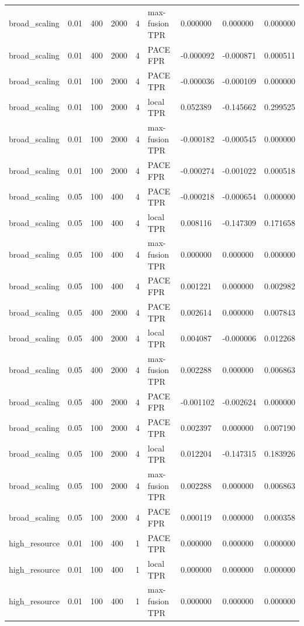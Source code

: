 \begin{tabular}{lllllllll}
broad\_scaling & 0.01 & 400 & 2000 & 4 & max-fusion TPR & 0.000000 & 0.000000 & 0.000000 \\
broad\_scaling & 0.01 & 400 & 2000 & 4 & PACE FPR & -0.000092 & -0.000871 & 0.000511 \\
broad\_scaling & 0.01 & 100 & 2000 & 4 & PACE TPR & -0.000036 & -0.000109 & 0.000000 \\
broad\_scaling & 0.01 & 100 & 2000 & 4 & local TPR & 0.052389 & -0.145662 & 0.299525 \\
broad\_scaling & 0.01 & 100 & 2000 & 4 & max-fusion TPR & -0.000182 & -0.000545 & 0.000000 \\
broad\_scaling & 0.01 & 100 & 2000 & 4 & PACE FPR & -0.000274 & -0.001022 & 0.000518 \\
broad\_scaling & 0.05 & 100 & 400 & 4 & PACE TPR & -0.000218 & -0.000654 & 0.000000 \\
broad\_scaling & 0.05 & 100 & 400 & 4 & local TPR & 0.008116 & -0.147309 & 0.171658 \\
broad\_scaling & 0.05 & 100 & 400 & 4 & max-fusion TPR & 0.000000 & 0.000000 & 0.000000 \\
broad\_scaling & 0.05 & 100 & 400 & 4 & PACE FPR & 0.001221 & 0.000000 & 0.002982 \\
broad\_scaling & 0.05 & 400 & 2000 & 4 & PACE TPR & 0.002614 & 0.000000 & 0.007843 \\
broad\_scaling & 0.05 & 400 & 2000 & 4 & local TPR & 0.004087 & -0.000006 & 0.012268 \\
broad\_scaling & 0.05 & 400 & 2000 & 4 & max-fusion TPR & 0.002288 & 0.000000 & 0.006863 \\
broad\_scaling & 0.05 & 400 & 2000 & 4 & PACE FPR & -0.001102 & -0.002624 & 0.000000 \\
broad\_scaling & 0.05 & 100 & 2000 & 4 & PACE TPR & 0.002397 & 0.000000 & 0.007190 \\
broad\_scaling & 0.05 & 100 & 2000 & 4 & local TPR & 0.012204 & -0.147315 & 0.183926 \\
broad\_scaling & 0.05 & 100 & 2000 & 4 & max-fusion TPR & 0.002288 & 0.000000 & 0.006863 \\
broad\_scaling & 0.05 & 100 & 2000 & 4 & PACE FPR & 0.000119 & 0.000000 & 0.000358 \\
high\_resource & 0.01 & 100 & 400 & 1 & PACE TPR & 0.000000 & 0.000000 & 0.000000 \\
high\_resource & 0.01 & 100 & 400 & 1 & local TPR & 0.000000 & 0.000000 & 0.000000 \\
high\_resource & 0.01 & 100 & 400 & 1 & max-fusion TPR & 0.000000 & 0.000000 & 0.000000 \\

\end{tabular}
